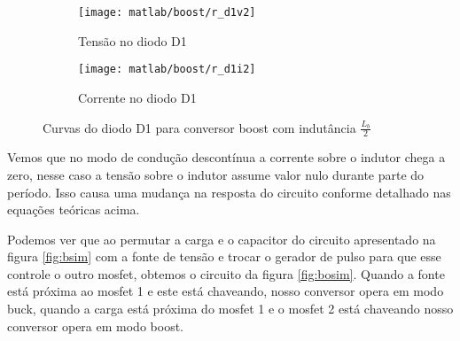 \documentclass{article}
\begin{document}
\begin{figure}[H]
	\centering
	\begin{subfigure}[b]{0.4\linewidth}
		\texttt{[image: matlab/boost/r\_d1v2]}
		\caption{Tensão no diodo D1}
	\end{subfigure}
	\begin{subfigure}[b]{0.4\linewidth}
		\centering
		\texttt{[image: matlab/boost/r\_d1i2]}
		\caption{Corrente no diodo D1}
	\end{subfigure}
	\caption{Curvas do diodo D1 para conversor boost com indutância $\frac{L_b}{2}$}
	\label{fig:bod12}
\end{figure}

Vemos que no modo de condução descontínua a corrente sobre o indutor chega a zero, nesse caso a tensão sobre o indutor assume valor nulo durante parte do período. Isso causa uma mudança na resposta do circuito conforme detalhado nas equações teóricas acima.

Podemos ver que ao permutar a carga e o capacitor do circuito apresentado na figura \ref{fig:bsim} com a fonte de tensão e trocar o gerador de pulso para que esse controle o outro mosfet, obtemos o circuito da figura \ref{fig:bosim}. Quando a fonte está próxima ao mosfet 1 e este está chaveando, nosso conversor opera em modo buck, quando a carga está próxima do mosfet 1 e o mosfet 2 está chaveando nosso conversor opera em modo boost.

\end{document}
